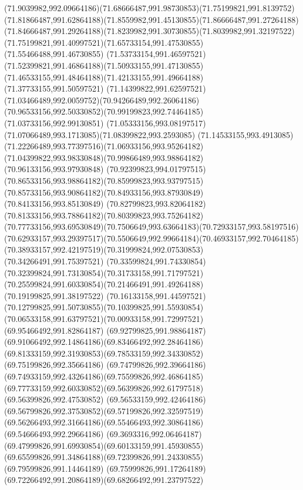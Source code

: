{{		\curveto(71.9039982,992.09664186)(71.68666487,991.98730853)(71.75199821,991.8139752)
		\curveto(71.81866487,991.62864188)(71.8559982,991.45130855)(71.86666487,991.27264188)
		\curveto(71.84666487,991.29264188)(71.8239982,991.30730855)(71.8039982,991.32197522)
		\curveto(71.75199821,991.40997521)(71.65733154,991.47530855)(71.55466488,991.46730855)
		\curveto(71.53733154,991.46597521)(71.52399821,991.46864188)(71.50933155,991.47130855)
		\curveto(71.46533155,991.48464188)(71.42133155,991.49664188)(71.37733155,991.50597521)
		\curveto(71.14399822,991.62597521)(71.03466489,992.0059752)(70.94266489,992.26064186)
		\curveto(70.96533156,992.50330852)(70.99199823,992.74464185)(71.03733156,992.99130851)
		\curveto(71.05333156,993.08197517)(71.07066489,993.1713085)(71.08399822,993.2593085)
		\curveto(71.14533155,993.4913085)(71.22266489,993.77397516)(71.06933156,993.95264182)
		\curveto(71.04399822,993.98330848)(70.99866489,993.98864182)(70.96133156,993.97930848)
		\curveto(70.92399823,994.01797515)(70.86533156,993.98864182)(70.85999823,993.93797515)
		\curveto(70.85733156,993.90864182)(70.84933156,993.87930849)(70.84133156,993.85130849)
		\curveto(70.82799823,993.82064182)(70.81333156,993.78864182)(70.80399823,993.75264182)
		\curveto(70.77733156,993.69530849)(70.7506649,993.63664183)(70.72933157,993.58197516)
		\curveto(70.62933157,993.29397517)(70.5506649,992.99664184)(70.46933157,992.70464185)
		\curveto(70.38933157,992.42197519)(70.31999824,992.07530853)(70.34266491,991.75397521)
		\curveto(70.33599824,991.74330854)(70.32399824,991.73130854)(70.31733158,991.71797521)
		\curveto(70.25599824,991.60330854)(70.21466491,991.49264188)(70.19199825,991.38197522)
		\curveto(70.16133158,991.44597521)(70.12799825,991.50730855)(70.10399825,991.55930854)
		\curveto(70.06533158,991.63797521)(70.00933158,991.72997521)(69.95466492,991.82864187)
		\curveto(69.92799825,991.98864187)(69.91066492,992.14864186)(69.83466492,992.28464186)
		\curveto(69.81333159,992.31930853)(69.78533159,992.34330852)(69.75199826,992.35664186)
		\curveto(69.74799826,992.39664186)(69.74933159,992.43264186)(69.75599826,992.46864185)
		\curveto(69.77733159,992.60330852)(69.56399826,992.61797518)(69.56399826,992.47530852)
		\curveto(69.56533159,992.42464186)(69.56799826,992.37530852)(69.57199826,992.32597519)
		\curveto(69.56266493,992.31664186)(69.55466493,992.30864186)(69.54666493,992.29664186)
		\curveto(69.3693316,992.06464187)(69.47999826,991.69930854)(69.60133159,991.45930855)
		\curveto(69.65599826,991.34864188)(69.72399826,991.24330855)(69.79599826,991.14464189)
		\curveto(69.75999826,991.17264189)(69.72266492,991.20864189)(69.68266492,991.23797522)
}}
